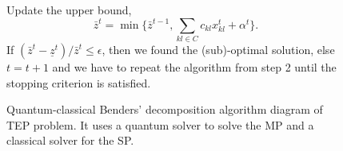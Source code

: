 \begin{figure}
\begin{tcolorbox}[colback=white!5!white,colframe=black!75!black,title=Benders' decomposition algorithm]
\begin{tcolorbox}[colback=red!5!white,colframe=red!75!black,title=\textbf{Step 3:} Slave problem solved by a classical solver]
\begin{mini!}[2]
    \end{mini!}
    \end{tcolorbox}
    \begin{tcolorbox}[colback=black!5!white,colframe=black!75!black,title=\textbf{Step 4:} Stopping criterion]
    Update the upper bound,
    \begin{equation}
    \bar{z}^{t} =\min \{\bar{z}^{t-1}, \sum_{kl\in C}c_{kl}x_{kl}^{t} + \alpha^{t}\}.
    \end{equation}
    If $\left(\bar{z}^{t} - \underline{z}^{t}\right)/\bar{z}^{t}\leq \epsilon$, then we found the (sub)-optimal solution, else $t=t+1$ and we have to repeat the algorithm from step 2 until the stopping criterion is satisfied.
    \end{tcolorbox}
    \end{tcolorbox}
    \caption{Quantum-classical Benders' decomposition algorithm diagram of TEP problem. It uses a quantum solver to solve the MP and a classical solver for the SP.}
    \label{fig:BendersSchemeTEP}
\end{figure}


